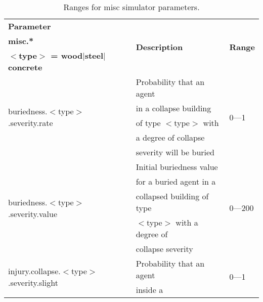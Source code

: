 \documentclass{article}
\begin{document}
\begin{table}[htb]
\caption{Ranges for misc simulator parameters.}
\label{tab:11}
\centering
\begin{tabular}{lll}
  \hline
  \textbf{Parameter}                                            &
  \multirow{3}{*}{\textbf{Description}} & \multirow{3}{*}{\textbf{Range}}\\
  \textbf{misc.*}                                               &
                                        & \\
  \textbf{$<$type$>$ = wood$|$steel$|$concrete}                 &
                                        & \\
  \hline
  \multirow{5}{*}{buriedness.$<$type$>$.severity.rate}          & Probability
  that an agent                         & \multirow{5}{*}{0---1}\\
                                                                & in a collapse
  building                              & \\
                                                                & of type
  $<$type$>$ with                       & \\
                                                                & a degree of
  collapse                              & \\
                                                                & severity will
   be buried                            & \\
  \hline
  \multirow{5}{*}{buriedness.$<$type$>$.severity.value}         & Initial
  buriedness value                      & \multirow{5}{*}{0---200}\\
                                                                & for a buried
  agent in a                            & \\
                                                                & collapsed
   building of type                     & \\
                                                                & $<$type$>$
  with a degree of                      & \\
                                                                & collapse
  severity                              & \\
  \hline
  \multirow{5}{*}{injury.collapse.$<$type$>$.severity.slight}   &  Probability
  that an agent                         & \multirow{5}{*}{0---1}\\
                                                                & inside a

\end{tabular}
\end{table}
\end{document}
